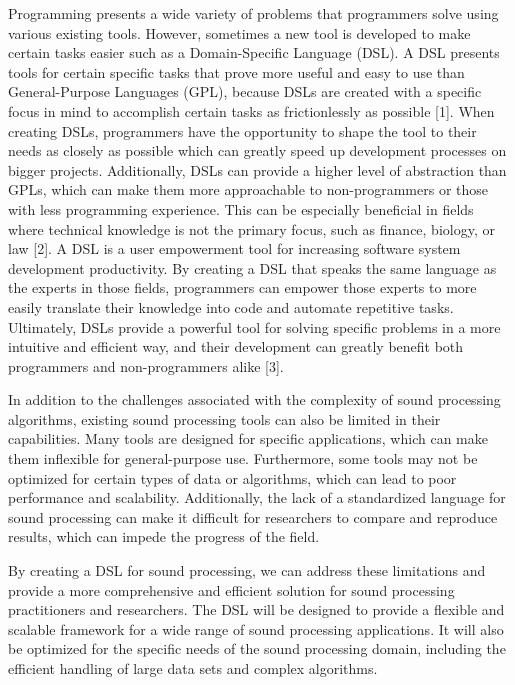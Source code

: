 Programming presents a wide variety of problems that programmers solve using various existing tools. However, sometimes a new tool is developed to make certain tasks easier such as a Domain-Specific Language (DSL). A DSL presents tools for certain specific tasks that prove more useful and easy to use than General-Purpose Languages (GPL), because DSLs are created with a specific focus in mind to accomplish certain tasks as frictionlessly as possible [1]. 
When creating DSLs, programmers have the opportunity to shape the tool to their needs as closely as possible which can greatly speed up development processes on bigger projects.
Additionally, DSLs can provide a higher level of abstraction than GPLs, which can make them more approachable to non-programmers or those with less programming experience. This can be especially beneficial in fields where technical knowledge is not the primary focus, such as finance, biology, or law [2]. A DSL is a user empowerment tool for increasing software system development productivity. By creating a DSL that speaks the same language as the experts in those fields, programmers can empower those experts to more easily translate their knowledge into code and automate repetitive tasks. Ultimately, DSLs provide a powerful tool for solving specific problems in a more intuitive and efficient way, and their development can greatly benefit both programmers and non-programmers alike [3].

In addition to the challenges associated with the complexity of sound processing algorithms, existing sound processing tools can also be limited in their capabilities. Many tools are designed for specific applications, which can make them inflexible for general-purpose use. Furthermore, some tools may not be optimized for certain types of data or algorithms, which can lead to poor performance and scalability. Additionally, the lack of a standardized language for sound processing can make it difficult for researchers to compare and reproduce results, which can impede the progress of the field.

By creating a DSL for sound processing, we can address these limitations and provide a more comprehensive and efficient solution for sound processing practitioners and researchers. The DSL will be designed to provide a flexible and scalable framework for a wide range of sound processing applications. It will also be optimized for the specific needs of the sound processing domain, including the efficient handling of large data sets and complex algorithms.

